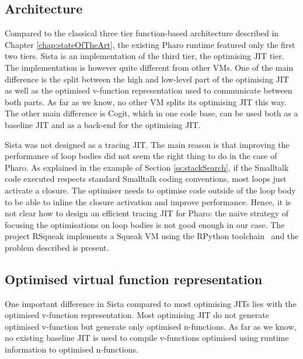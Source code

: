 \documentclass[a4paper,12pt,twoside]{../includes/ThesisStyle}
\begin{document}
\subsection{Architecture}
\label{sec:relWArch}

Compared to the classical three tier function-based architecture described in Chapter \ref{chap:stateOfTheArt}, the existing Pharo runtime featured only the first two tiers. Sista is an implementation of the third tier, the optimising JIT tier. The implementation is however quite different from other VMs. One of the main difference is the split between the high and low-level part of the optimising JIT as well as the optimised v-function representation used to communicate between both parts. As far as we know, no other VM splits its optimising JIT this way. The other main difference is Cogit, which in one code base, can be used both as a baseline JIT and as a back-end for the optimising JIT.

Sista was not designed as a tracing JIT. The main reason is that improving the performance of loop bodies did not seem the right thing to do in the case of Pharo. As explained in the example of Section \ref{ss:stackSearch}, if the Smalltalk code executed respects standard Smalltalk coding conventions, most loops just activate a closure. The optimiser needs to optimise code outside of the loop body to be able to inline the closure activation and improve performance. Hence, it is not clear how to design an efficient tracing JIT for Pharo: the naive strategy of focusing the optimisations on loop bodies is not good enough in our case. The project RSqueak\cite{Felg16f} implements a Squeak VM using the RPython toolchain~\cite{Rigo06a} and the problem described is present.

\subsection{Optimised virtual function representation}
\label{sec:interface}

One important difference in Sista compared to most optimising JITs lies with the optimised v-function representation. Most optimising JIT do not generate optimised v-function but generate only optimised n-functions. As far as we know, no existing baseline JIT is used to compile v-functions optimised using runtime information to optimised n-functions.
\end{document}
